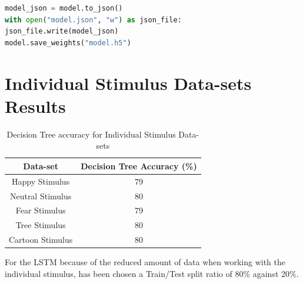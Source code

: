 \begin{appendices}
\begin{lstlisting}[language=Python, caption=Storing CNN Model]
model_json = model.to_json()
with open("model.json", "w") as json_file:
json_file.write(model_json)
model.save_weights("model.h5")
\end{lstlisting}


% 





\clearpage
\section{Individual Stimulus Data-sets Results}
\setcounter{figure}{0}
\setcounter{table}{0}
{
\begin{table}[h!]
\centering
\begin{tabular}{|c|c|}
\hline
Data-set &Decision Tree Accuracy (\%) \\
\hline
Happy Stimulus & 79  \\
Neutral Stimulus & 80  \\
Fear Stimulus & 79  \\
Tree Stimulus & 80 \\
Cartoon Stimulus & 80 \\
\hline
\end{tabular}
\caption{Decision Tree accuracy for Individual Stimulus Data-sets}
\label{table:1}
\end{table}
}

For the LSTM because of the reduced amount of data when working with the individual stimulus, has been chosen a Train/Test split ratio of 80\% against 20\%.


\end{appendices}
